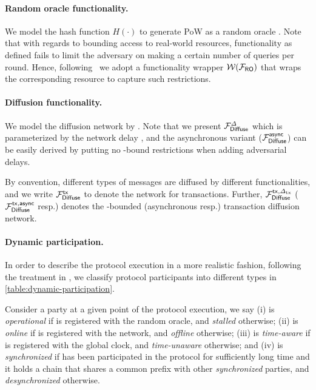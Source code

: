 

\paragraph{Random oracle functionality.}
%
We model the hash function $H(\cdot)$ to generate PoW as a random oracle \funcRO.
%
Note that with regards to bounding access to real-world resources, functionality \funcRO as defined fails to limit the adversary on making a certain number of queries per round.
%
Hence, following~\cite{C:BMTZ17,EC:GKOPZ20} we adopt a functionality wrapper $\mathcal{W}(\mathcal{F}_{\textsf{RO}})$ that wraps the corresponding resource to capture such restrictions.



\paragraph{Diffusion functionality.}
%
We model the diffusion network by \funcDiffuse \cite{C:BMTZ17}.
%
Note that we present $\mathcal{F}_{\textsf{Diffuse}}^\varDelta$ which is parameterized by the network delay \delay, and the asynchronous variant ($\mathcal{F}_{\textsf{Diffuse}}^{\mathsf{async}}$) can be easily derived by putting no \delay-bound restrictions when adding adversarial delays.

By convention, different types of messages are diffused by different functionalities, and we write $\mathcal{F}_{\textsf{Diffuse}}^{\mathsf{tx}}$ to denote the network for transactions.
%
Further, $\mathcal{F}_{\textsf{Diffuse}}^{\mathsf{tx}, \varDelta_{\mathrm{tx}}}$ ($\mathcal{F}_{\textsf{Diffuse}}^{\mathsf{tx}, \mathsf{async}}$ resp.) denotes the \txDelay-bounded (asynchronous resp.) transaction diffusion network.



\paragraph{Dynamic participation.}
%
In order to describe the protocol execution in a more realistic fashion, following the treatment in \cite{CCS:BGKRZ18}, we classify protocol participants into different types in \cref{table:dynamic-participation}.



Consider a party \party at a given point of the protocol execution, we say
%
(i) \party is \emph{operational} if \party is registered with the random oracle, and \emph{stalled} otherwise;
%
(ii) \party is \emph{online} if \party is registered with the network, and \emph{offline} otherwise;
%
(iii) \party is \emph{time-aware} if \party is registered with the global clock, and \emph{time-unaware} otherwise;
%
and (iv) \party is \emph{synchronized} if \party has been participated in the protocol for sufficiently long time and it holds a chain that shares a common prefix with other \emph{synchronized} parties, and \emph{desynchronized} otherwise.

